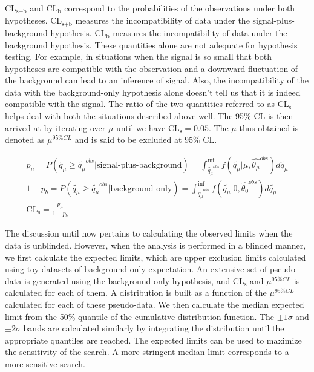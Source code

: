 CL$_\text{s+b}$ and CL$_\text{b}$ correspond to the probabilities of the observations under both hypotheses. CL$_\text{s+b}$ measures the incompatibility of data under the signal-plus-background hypothesis. CL$_\text{b}$ measures the incompatibility of data under the background hypothesis. These quantities alone are not adequate for hypothesis testing. For example, in situations when the signal is so small that both hypotheses are compatible with the observation and a downward fluctuation of the background can lead to an inference of signal. Also, the incompatibility of the data with the background-only hypothesis alone doesn't tell us that it is indeed compatible with the signal. The ratio of the two quantities referred to as CL$_\text{s}$ helps deal with both the situations described above well. The 95\% CL is then arrived at by iterating over $\mu$ until we have CL$_\text{s}=0.05$. The $\mu$ thus obtained is denoted as $\mu^{95\%CL}$ and is said to be excluded at 95\% CL.

\begin{gather}
  p_\mu=P(\tilde{q_\mu}\geq \tilde{q_\mu}^{obs}|\text{signal-plus-background})=\int_{\tilde{q_\mu}^{obs}}^{\inf}f(\tilde{q_\mu}|\mu,\hat{\theta_\mu}^{obs})d\tilde{q_\mu} \\
  1-p_b=P(\tilde{q_\mu}\geq \tilde{q_\mu}^{obs}|\text{background-only})=\int_{\tilde{q_\mu}^{obs}}^{\inf}f(\tilde{q_\mu}|0,\hat{\theta_0}^{obs})d\tilde{q_\mu} \\
  \text{CL}_\text{s}=\frac{p_\mu}{1-p_b}
\end{gather}

The discussion until now pertains to calculating the observed limits when the data is unblinded. However, when the analysis is performed in a blinded manner, we first calculate the expected limits, which are upper exclusion limits calculated using toy datasets of background-only expectation. An extensive set of pseudo-data is generated using the background-only hypothesis, and CL$_\text{s}$ and $\mu^{95\%CL}$ is calculated for each of them. A distribution is built as a function of the $\mu^{95\%CL}$ calculated for each of these pseudo-data. We then calculate the median expected limit from the 50\% quantile of the cumulative distribution function. The $\pm 1\sigma$ and $\pm 2\sigma$ bands are calculated similarly by integrating the distribution until the appropriate quantiles are reached. The expected limits can be used to maximize the sensitivity of the search. A more stringent median limit corresponds to a more sensitive search.

